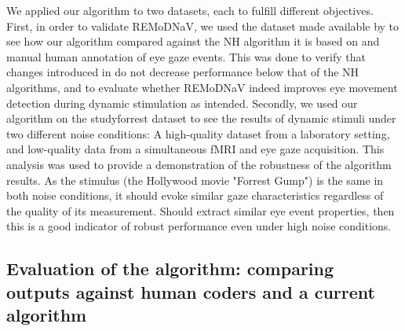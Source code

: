 We applied our algorithm to two datasets, each to fulfill different objectives. First, in order to validate REMoDNaV, we used the dataset made available by \citep{Andersson2017} to see how our algorithm compared against the NH algorithm it is based on and manual human annotation of eye gaze events. This was done to verify that changes introduced in \remodnav do not decrease performance below that of the NH algorithms, and to evaluate whether REMoDNaV indeed improves eye movement detection during dynamic stimulation as intended. Secondly, we used our algorithm on the studyforrest dataset \citep{Hanke2016} to see the results of dynamic stimuli under two different noise conditions: A high-quality dataset from a laboratory setting, and low-quality data from a simultaneous fMRI and eye gaze acquisition. This analysis was used to provide a demonstration of the robustness of the algorithm results. As the stimulus (the Hollywood movie "Forrest Gump") is the same in both noise conditions, it should evoke similar gaze characteristics regardless of the quality of its measurement. Should \remodnav extract similar eye event properties, then this is a good indicator of robust performance even under high noise conditions.

\subsection*{Evaluation of the algorithm: comparing outputs against human coders and a current algorithm}\label{ana_1}


